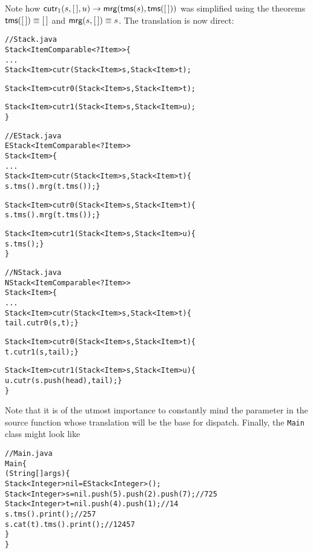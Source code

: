 Note how \(\textsf{cutr}_1(s,[\,],u) \rightarrow
\textsf{mrg}(\textsf{tms}(s),\textsf{tms}([\,]))\) was simplified using the
theorems \(\textsf{tms}([\,]) \equiv [\,]\) and \(\textsf{mrg}(s,[\,]) \equiv
s\). The translation is now direct:
\begin{alltt}
// Stack.java
\public \abstractX
\class Stack<Item \extends Comparable<? \super Item>> \{
  ...
  \public \abstractX
  Stack<Item> cutr(\final Stack<Item> s, \final Stack<Item> t);

  \protectedX \abstractX
  Stack<Item> cutr0(\final Stack<Item> s, \final Stack<Item> t);

  \protectedX \abstractX
  Stack<Item> cutr1(\final Stack<Item> s, \final Stack<Item> u);
\}

// EStack.java
\public \class EStack<Item \extends Comparable<? \super Item>>
\extends Stack<Item> \{
  ...
  \public
  Stack<Item> cutr(\final Stack<Item> s, \final Stack<Item> t) \{
    \return s.tms().mrg(t.tms()); \}

  \protectedX
  Stack<Item> cutr0(\final Stack<Item> s, \final Stack<Item> t) \{
    \return s.tms().mrg(t.tms()); \}

  \protectedX
  Stack<Item> cutr1(\final Stack<Item> s, \final Stack<Item> u) \{
    \return s.tms(); \}
\}

// NStack.java
\public \class NStack<Item \extends Comparable<? \super Item>>
       \extends Stack<Item> \{
  ...
  \public
  Stack<Item> cutr(\final Stack<Item> s, \final Stack<Item> t) \{
    \return tail.cutr0(s,t); \}

  \protectedX
   Stack<Item> cutr0(\final Stack<Item> s, \final Stack<Item> t) \{
    \return t.cutr1(s,tail); \}

  \protectedX
  Stack<Item> cutr1(\final Stack<Item> s, \final Stack<Item> u) \{
    \return u.cutr(s.push(head),tail); \}
\}
\end{alltt}
Note that it is of the utmost importance to constantly mind the
parameter in the source function whose translation will be the base
for dispatch. Finally, the \texttt{Main} class might look like
\begin{alltt}
// Main.java
\public \class Main \{
  \public \static \void \main (String[] args) \{
    Stack<Integer> nil = \new EStack<Integer>();
    Stack<Integer> s = nil.push(5).push(2).push(7);\hfill// 7 2 5
    Stack<Integer> t = nil.push(4).push(1);\hfill// 1 4
    s.tms().print();\hfill// 2 5 7
    s.cat(t).tms().print();\hfill// 1 2 4 5 7
  \}
\}
\end{alltt}
